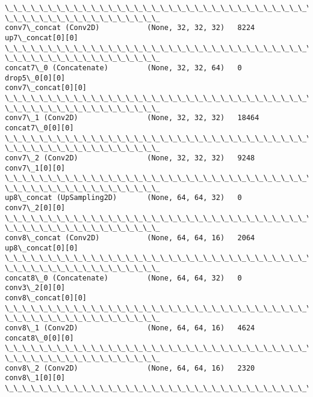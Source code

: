 \documentclass[11pt]{article}
\begin{document}
\begin{Verbatim}[commandchars=\\\{\}]
\_\_\_\_\_\_\_\_\_\_\_\_\_\_\_\_\_\_\_\_\_\_\_\_\_\_\_\_\_\_\_\_\_\_\_\_\_\_\_\_\_\_\_\_\_\_\_\_\_\_\_\_\_\_\_\_\_\_\_\_\_\_\_\_\_\_\_\_\_\_\_\_\_\_\_\_\_\_\_\_
\_\_\_\_\_\_\_\_\_\_\_\_\_\_\_\_\_\_
conv7\_concat (Conv2D)           (None, 32, 32, 32)   8224
up7\_concat[0][0]
\_\_\_\_\_\_\_\_\_\_\_\_\_\_\_\_\_\_\_\_\_\_\_\_\_\_\_\_\_\_\_\_\_\_\_\_\_\_\_\_\_\_\_\_\_\_\_\_\_\_\_\_\_\_\_\_\_\_\_\_\_\_\_\_\_\_\_\_\_\_\_\_\_\_\_\_\_\_\_\_
\_\_\_\_\_\_\_\_\_\_\_\_\_\_\_\_\_\_
concat7\_0 (Concatenate)         (None, 32, 32, 64)   0           drop5\_0[0][0]
conv7\_concat[0][0]
\_\_\_\_\_\_\_\_\_\_\_\_\_\_\_\_\_\_\_\_\_\_\_\_\_\_\_\_\_\_\_\_\_\_\_\_\_\_\_\_\_\_\_\_\_\_\_\_\_\_\_\_\_\_\_\_\_\_\_\_\_\_\_\_\_\_\_\_\_\_\_\_\_\_\_\_\_\_\_\_
\_\_\_\_\_\_\_\_\_\_\_\_\_\_\_\_\_\_
conv7\_1 (Conv2D)                (None, 32, 32, 32)   18464       concat7\_0[0][0]
\_\_\_\_\_\_\_\_\_\_\_\_\_\_\_\_\_\_\_\_\_\_\_\_\_\_\_\_\_\_\_\_\_\_\_\_\_\_\_\_\_\_\_\_\_\_\_\_\_\_\_\_\_\_\_\_\_\_\_\_\_\_\_\_\_\_\_\_\_\_\_\_\_\_\_\_\_\_\_\_
\_\_\_\_\_\_\_\_\_\_\_\_\_\_\_\_\_\_
conv7\_2 (Conv2D)                (None, 32, 32, 32)   9248        conv7\_1[0][0]
\_\_\_\_\_\_\_\_\_\_\_\_\_\_\_\_\_\_\_\_\_\_\_\_\_\_\_\_\_\_\_\_\_\_\_\_\_\_\_\_\_\_\_\_\_\_\_\_\_\_\_\_\_\_\_\_\_\_\_\_\_\_\_\_\_\_\_\_\_\_\_\_\_\_\_\_\_\_\_\_
\_\_\_\_\_\_\_\_\_\_\_\_\_\_\_\_\_\_
up8\_concat (UpSampling2D)       (None, 64, 64, 32)   0           conv7\_2[0][0]
\_\_\_\_\_\_\_\_\_\_\_\_\_\_\_\_\_\_\_\_\_\_\_\_\_\_\_\_\_\_\_\_\_\_\_\_\_\_\_\_\_\_\_\_\_\_\_\_\_\_\_\_\_\_\_\_\_\_\_\_\_\_\_\_\_\_\_\_\_\_\_\_\_\_\_\_\_\_\_\_
\_\_\_\_\_\_\_\_\_\_\_\_\_\_\_\_\_\_
conv8\_concat (Conv2D)           (None, 64, 64, 16)   2064
up8\_concat[0][0]
\_\_\_\_\_\_\_\_\_\_\_\_\_\_\_\_\_\_\_\_\_\_\_\_\_\_\_\_\_\_\_\_\_\_\_\_\_\_\_\_\_\_\_\_\_\_\_\_\_\_\_\_\_\_\_\_\_\_\_\_\_\_\_\_\_\_\_\_\_\_\_\_\_\_\_\_\_\_\_\_
\_\_\_\_\_\_\_\_\_\_\_\_\_\_\_\_\_\_
concat8\_0 (Concatenate)         (None, 64, 64, 32)   0           conv3\_2[0][0]
conv8\_concat[0][0]
\_\_\_\_\_\_\_\_\_\_\_\_\_\_\_\_\_\_\_\_\_\_\_\_\_\_\_\_\_\_\_\_\_\_\_\_\_\_\_\_\_\_\_\_\_\_\_\_\_\_\_\_\_\_\_\_\_\_\_\_\_\_\_\_\_\_\_\_\_\_\_\_\_\_\_\_\_\_\_\_
\_\_\_\_\_\_\_\_\_\_\_\_\_\_\_\_\_\_
conv8\_1 (Conv2D)                (None, 64, 64, 16)   4624        concat8\_0[0][0]
\_\_\_\_\_\_\_\_\_\_\_\_\_\_\_\_\_\_\_\_\_\_\_\_\_\_\_\_\_\_\_\_\_\_\_\_\_\_\_\_\_\_\_\_\_\_\_\_\_\_\_\_\_\_\_\_\_\_\_\_\_\_\_\_\_\_\_\_\_\_\_\_\_\_\_\_\_\_\_\_
\_\_\_\_\_\_\_\_\_\_\_\_\_\_\_\_\_\_
conv8\_2 (Conv2D)                (None, 64, 64, 16)   2320        conv8\_1[0][0]
\_\_\_\_\_\_\_\_\_\_\_\_\_\_\_\_\_\_\_\_\_\_\_\_\_\_\_\_\_\_\_\_\_\_\_\_\_\_\_\_\_\_\_\_\_\_\_\_\_\_\_\_\_\_\_\_\_\_\_\_\_\_\_\_\_\_\_\_\_\_\_\_\_\_\_\_\_\_\_\_

\end{Verbatim}
\end{document}
